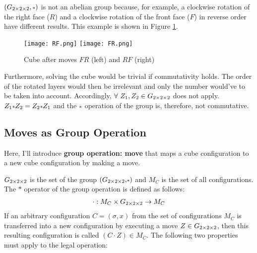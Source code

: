 $(\Gtwo, \mathlarger{\scriptstyle*})$ is not an abelian group because, for example, a clockwise rotation of the right face ($R$) and a clockwise rotation of the front face ($F$) in reverse order have different results. This example is shown in Figure \ref{Figure_CubeAfterFRandRF}.
\begin{figure}[H]
\centering
\texttt{[image: RF.png]}
\texttt{[image: FR.png]}
\caption[Cube after moves $FR$ (left) and $RF$ (right)]{Cube after moves $FR$ (left) and $RF$ (right)}
\label{Figure_CubeAfterFRandRF}
\end{figure}
Furthermore, solving the cube would be trivial if commutativity holds. \cite{TD} The order of the rotated layers would then be irrelevant and only the number would've to be taken into account.
Accordingly, $\forall \ Z_1, Z_2 \in \Gtwo$ does not apply. $Z_1 \mathlarger{\scriptstyle*} Z_2 = Z_2 \mathlarger{\scriptstyle*} Z_1$ and the $\mathlarger{\scriptstyle*}$ operation of the group is, therefore, not commutative.

\subsection{Moves as Group Operation}
Here, I'll introduce \textbf{group operation: move} that maps a cube configuration to a new cube configuration by making a move. %

$G_{2\times 2\times 2}$ is the set of the group $\left(G_{2\times 2\times 2}, \scriptstyle*\right)$ and $M_C$ is the set of all configurations. The $\scriptstyle*$ operator of the group operation is defined as follows:
\begin{align*}
\cdot: M_C \times G_{2\times 2\times 2} \rightarrow M_C
\end{align*}
If an arbitrary configuration $C=(\sigma, x)$ from the set of configurations $M_C$ is transferred into a new configuration by executing a move $Z \in G_{2\times 2\times 2}$, then this resulting configuration is called $(C \cdot Z)  \in M_C$.
The following two properties must apply to the legal operation:

